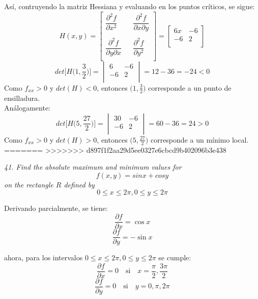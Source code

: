 \documentclass[a4paper,12pt]{article}
\begin{document}
			Así, contruyendo la matriz Hessiana y evaluando en los puntos críticos, se sigue:
				$$H(x,y) = \begin{bmatrix}
						\dfrac{\partial^2f}{\partial x^2} & & \dfrac{\partial^2f}{\partial x\partial y} \\
						& & \\
						\dfrac{\partial^2f}{\partial y\partial x}&  & \dfrac{\partial^2f}{\partial y^2} \\
						\end{bmatrix} =
						\begin{bmatrix}
							6x & -6 \\
							-6  & 2 \\
						\end{bmatrix}
						$$
				$$det \Big[H \Big(1, \frac{3}{2}\Big)\Big] =
						\begin{vmatrix}
							6 & -6 \\
							-6  & 2 \\
						\end{vmatrix} = 12 - 36 = - 24 < 0
				$$
				Como $f_{xx} > 0$ y $det(H) < 0$, entonces $\Big(1, \frac{3}{2}\Big)$ corresponde a un
				punto de ensilladura.\\

				Análogamente:\\
				$$det \Big[H \Big(5, \frac{27}{2}\Big)\Big] =
						\begin{vmatrix}
							30 & -6 \\
							-6  & 2 \\
						\end{vmatrix} = 60 - 36 = 24 > 0
				$$
				Como $f_{xx} > 0$ y $det(H) > 0$, entonces $\Big(5, \frac{27}{2}\Big)$
				corresponde a un mínimo local.\\

=======
>>>>>>> d897f1f2aa29d5ee0327e6cbcd9b402096b3e438


	\textit{41. Find the absolute maximum and minimum values for
		$$f(x, y) = sin x + cos y$$ on the rectangle $R$ defined by
		$$0 \leq x \leq 2\pi, 0 \leq y \leq 2\pi$$}

		Derivando parcialmente, se tiene:
		$$\frac{\partial f}{\partial x} = \cos x $$
		$$\frac{\partial f}{\partial y} = - \sin x $$

		ahora, para los intervalos $0 \leq x \leq 2\pi, 0 \leq y \leq 2\pi$
		se cumple:
			$$\frac{\partial f}{\partial x} = 0 \quad \text{si} \quad
				x=\frac{\pi}{2}, \frac{3\pi}{2}$$
			$$\frac{\partial f}{\partial y} = 0 \quad \text{si} \quad
				y=0, \pi, 2\pi$$
\end{document}

